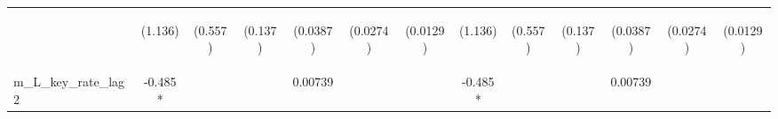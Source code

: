 \documentclass[]{article}
\begin{document}
\begin{center}
\begin{tabular}{lcccccccccccc}
\vspace{4pt} & \begin{footnotesize}(1.136)\end{footnotesize} & \begin{footnotesize}(0.557)\end{footnotesize} & \begin{footnotesize}(0.137)\end{footnotesize} & \begin{footnotesize}(0.0387)\end{footnotesize} & \begin{footnotesize}(0.0274)\end{footnotesize} & \begin{footnotesize}(0.0129)\end{footnotesize} & \begin{footnotesize}(1.136)\end{footnotesize} & \begin{footnotesize}(0.557)\end{footnotesize} & \begin{footnotesize}(0.137)\end{footnotesize} & \begin{footnotesize}(0.0387)\end{footnotesize} & \begin{footnotesize}(0.0274)\end{footnotesize} & \begin{footnotesize}(0.0129)\end{footnotesize} \\
m\_L\_key\_rate\_lag2 & -0.485* &  &  & 0.00739 &  &  & -0.485* &  &  & 0.00739 &  &  \\

\end{tabular}
\end{center}
\end{document}
